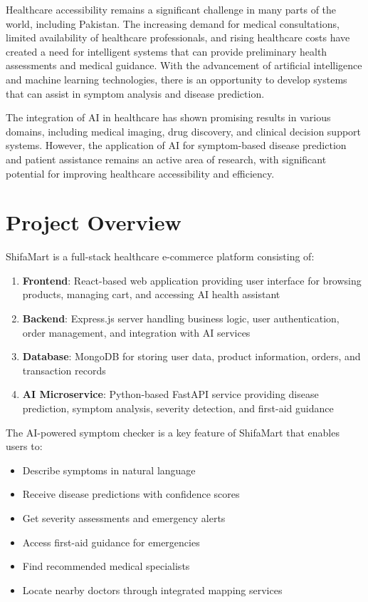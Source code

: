 \documentclass[12pt,a4paper]{article}
\begin{document}
Healthcare accessibility remains a significant challenge in many parts of the world, including Pakistan. The increasing demand for medical consultations, limited availability of healthcare professionals, and rising healthcare costs have created a need for intelligent systems that can provide preliminary health assessments and medical guidance. With the advancement of artificial intelligence and machine learning technologies, there is an opportunity to develop systems that can assist in symptom analysis and disease prediction.

The integration of AI in healthcare has shown promising results in various domains, including medical imaging, drug discovery, and clinical decision support systems. However, the application of AI for symptom-based disease prediction and patient assistance remains an active area of research, with significant potential for improving healthcare accessibility and efficiency.

\section{Project Overview}
ShifaMart is a full-stack healthcare e-commerce platform consisting of:

\begin{enumerate}
    \item \textbf{Frontend}: React-based web application providing user interface for browsing products, managing cart, and accessing AI health assistant
    \item \textbf{Backend}: Express.js server handling business logic, user authentication, order management, and integration with AI services
    \item \textbf{Database}: MongoDB for storing user data, product information, orders, and transaction records
    \item \textbf{AI Microservice}: Python-based FastAPI service providing disease prediction, symptom analysis, severity detection, and first-aid guidance
\end{enumerate}

The AI-powered symptom checker is a key feature of ShifaMart that enables users to:
\begin{itemize}
    \item Describe symptoms in natural language
    \item Receive disease predictions with confidence scores
    \item Get severity assessments and emergency alerts
    \item Access first-aid guidance for emergencies
    \item Find recommended medical specialists
    \item Locate nearby doctors through integrated mapping services
\end{itemize}
\end{document}
